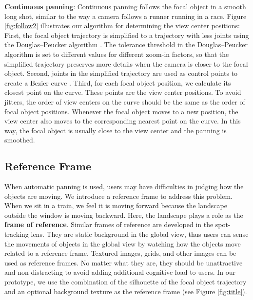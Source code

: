 \documentclass[review]{vgtc}                 %
\begin{document}
{\bf Continuous panning}: Continuous panning follows the focal object in a smooth long shot, similar to the way a camera follows a runner running in a race. Figure \ref{fig:follow2} illustrates our algorithm for determining the view center positions: First, the focal object trajectory is simplified to a trajectory with less joints using the Douglas–Peucker algorithm \cite{heckbert1997survey}. The tolerance threshold in the Douglas–Peucker algorithm is set to different values for different zoom-in factors, so that the simplified trajectory preserves more details when the camera is closer to the focal object. Second, joints in the simplified trajectory are used as control points to create a Bezier curve \cite{yamaguchi1988curves}. Third, for each focal object position, we calculate its closest point on the curve. These points are the view center positions. To avoid jitters, the order of view centers on the curve should be the same as the order of focal object positions. Whenever the focal object moves to a new position, the view center also moves to the corresponding nearest point on the curve. In this way, the focal object is usually close to the view center and the panning is smoothed.

\subsection{Reference Frame}
When automatic panning is used, users may have difficulties in judging how the objects are moving. We introduce a reference frame to address this problem. When we sit in a train, we feel it is moving forward because the landscape outside the window is moving backward. Here, the landscape plays a role as the {\bf frame of reference}. Similar frames of reference are developed in the spot-tracking lens. They are static background in the global view, thus users can sense the movements of objects in the global view by watching how the objects move related to a reference frame. Textured images, grids, and other images can be used as reference frames. No matter what they are, they should be unattractive and non-distracting to avoid adding additional cognitive load to users. In our prototype, we use the combination of the silhouette of the focal object trajectory and an optional background texture as the reference frame (see Figure \ref{fig:title}).
\end{document}
